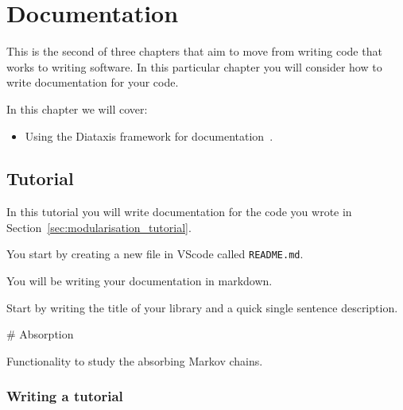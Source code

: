 \chapter{Documentation}
\label{chp:documentation} 

This is the second of three chapters that aim to move from writing code
that works to writing software. In this particular chapter you will consider how
to write documentation for your code.

\begin{note}
In this chapter we will cover:
\begin{itemize}
\item 

Using the Diataxis framework for
documentation~\cite{Procida_Diataxis_documentation_framework}.

\end{itemize}
\end{note}




\section{Tutorial}
\label{\detokenize{building-tools/06-documentation/tutorial/main:tutorial}}\label{\detokenize{building-tools/06-documentation/tutorial/main:documentation}}\label{\detokenize{building-tools/06-documentation/tutorial/main::doc}}

In this tutorial you will write documentation for the code
you wrote in Section~\ref{sec:modularisation_tutorial}.


You start by creating a new file in VScode called \texttt{README.md}.

\begin{note}
You will be writing your documentation in markdown.
\end{note}


Start by writing the title of your library and a quick single sentence
description.

\begin{md}
# Absorption

Functionality to study the absorbing Markov chains.
\end{md}


\subsection{Writing a tutorial}
\label{\detokenize{building-tools/06-documentation/tutorial/main:writing-a-tutorial}}

